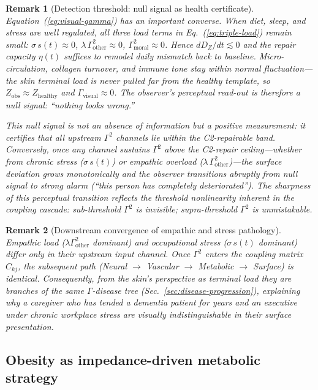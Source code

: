 \documentclass[aps,pre,twocolumn,superscriptaddress,floatfix]{revtex4-2}
\newtheorem{remark}{Remark}
\begin{document}
\begin{remark}[Detection threshold: null signal as
health certificate]
\label{rem:detection-threshold}
Equation~(\ref{eq:visual-gamma}) has an important
converse.
When diet, sleep, and stress are well regulated,
all three load terms in Eq.~(\ref{eq:triple-load})
remain small:
$\sigma\,s(t) \approx 0$,
$\lambda\,\Gamma^2_{\text{other}} \approx 0$,
$\Gamma^2_{\text{moral}} \approx 0$.
Hence $dD_Z/dt \lesssim 0$ and the repair capacity
$\eta(t)$ suffices to remodel daily mismatch back
to baseline.
Micro-circulation, collagen turnover, and immune
tone stay within normal fluctuation---the skin
terminal load is never pulled far from the
healthy template, so
$Z_{\text{obs}} \approx Z_{\text{healthy}}$
and $\Gamma_{\text{visual}} \approx 0$.
The observer's perceptual read-out is therefore
a \emph{null signal}: ``nothing looks wrong.''

This null signal is not an absence of information
but a positive measurement:
it certifies that all upstream $\Gamma^2$ channels
lie within the C2-repairable band.
Conversely, once any channel sustains
$\Gamma^2$ above the C2-repair ceiling---whether from
chronic stress ($\sigma\,s(t)$) or empathic overload
($\lambda\,\Gamma^2_{\text{other}}$)---the
surface deviation grows monotonically and the
observer transitions abruptly from null signal to
strong alarm (``this person has completely
deteriorated'').
The sharpness of this perceptual transition reflects
the threshold nonlinearity inherent in the
coupling cascade: sub-threshold $\Gamma^2$ is
invisible; supra-threshold $\Gamma^2$ is
unmistakable.
\end{remark}

\begin{remark}[Downstream convergence of empathic and
stress pathology]
\label{rem:downstream-convergence}
Empathic load ($\lambda\Gamma^2_{\text{other}}$ dominant)
and occupational stress ($\sigma\,s(t)$ dominant) differ
only in their \emph{upstream} input channel.
Once $\Gamma^2$ enters the coupling matrix $C_{kj}$,
the subsequent path
(Neural $\to$ Vascular $\to$ Metabolic $\to$ Surface)
is identical.
Consequently, from the skin's perspective as terminal
load they are branches of the same $\Gamma$-disease
tree (Sec.~\ref{sec:disease-progression}),
explaining why a caregiver who has tended a dementia
patient for years and an executive under chronic
workplace stress are visually indistinguishable
in their surface presentation.
\end{remark}

\subsection{Obesity as impedance-driven metabolic strategy}
\label{sec:obesity}
\end{document}
